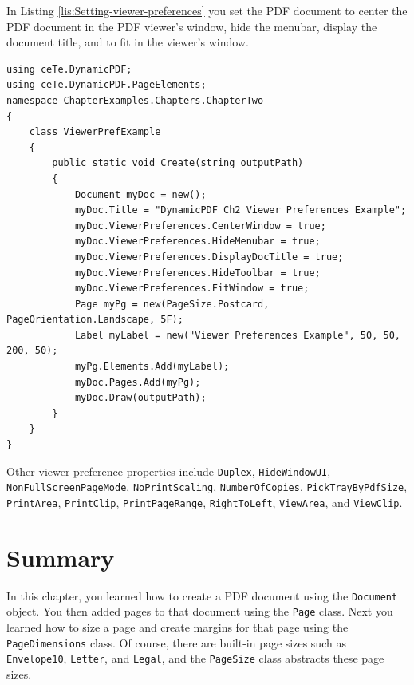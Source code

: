 \documentclass[american]{tufte-book}
\numberwithin{equation}{section}
\numberwithin{figure}{section}
\begin{document}
In Listing \ref{lis:Setting-viewer-preferences} you set the PDF document to center the PDF document in the PDF viewer's window, hide the menubar, display the document title, and to fit in the viewer's window.
\bgroup{}
\begin{lstlisting}[caption={Setting viewer preferences.},label={lis:Setting-viewer-preferences},basicstyle={\footnotesize\ttfamily},breaklines=true]
using ceTe.DynamicPDF;
using ceTe.DynamicPDF.PageElements;
namespace ChapterExamples.Chapters.ChapterTwo
{
    class ViewerPrefExample
    {
        public static void Create(string outputPath)
        {
            Document myDoc = new();
            myDoc.Title = "DynamicPDF Ch2 Viewer Preferences Example";
            myDoc.ViewerPreferences.CenterWindow = true;
            myDoc.ViewerPreferences.HideMenubar = true;
            myDoc.ViewerPreferences.DisplayDocTitle = true;
            myDoc.ViewerPreferences.HideToolbar = true;
            myDoc.ViewerPreferences.FitWindow = true;
            Page myPg = new(PageSize.Postcard, PageOrientation.Landscape, 5F);
            Label myLabel = new("Viewer Preferences Example", 50, 50, 200, 50);
            myPg.Elements.Add(myLabel);
            myDoc.Pages.Add(myPg);
            myDoc.Draw(outputPath);
        }
    }
}
\end{lstlisting}
\leavevmode\egroup

Other viewer preference properties include \texttt{Duplex}, \texttt{HideWindowUI},
\texttt{NonFullScreenPageMode}, \texttt{NoPrintScaling}, \texttt{NumberOfCopies},
\texttt{PickTrayByPdfSize}, \texttt{PrintArea}, \texttt{PrintClip},
\texttt{PrintPageRange}, \texttt{RightToLeft}, \texttt{ViewArea},
and \texttt{ViewClip}. 

\section{Summary}

In this chapter, you learned how to create a PDF document using the
\texttt{Document} object. You then added pages to that document using
the \texttt{Page} class. Next you learned how to size a page and create
margins for that page using the \texttt{PageDimensions} class. Of
course, there are built-in page sizes such as \texttt{Envelope10},
\texttt{Letter}, and \texttt{Legal}, and the \texttt{PageSize} class
abstracts these page sizes.
\end{document}
